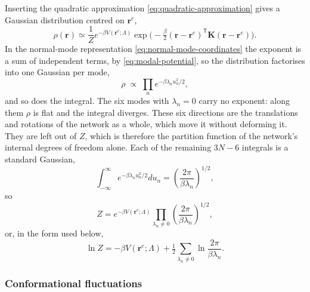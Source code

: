 \documentclass[11pt]{article}
\newcommand{\rr}{\mathbf{r}}
\newcommand{\KK}{\mathbf{K}}
\newcommand{\LL}{\Lambda}
\newcommand{\re}{\rr^{e}}
\begin{document}
Inserting the quadratic approximation \eqref{eq:quadratic-approximation} gives a Gaussian distribution centred on $\re$,
\begin{equation}
\boxed{
\rho(\rr) \simeq \frac{1}{Z} e^{-\beta V(\re;\LL)}
\exp\big(-\tfrac{\beta}{2}(\rr-\re)^{\mathsf T}\KK(\rr-\re)\big).
}
\label{eq:gaussian-distribution}
\end{equation}
In the normal-mode representation \eqref{eq:normal-mode-coordinates} the exponent is a sum of independent terms, by \eqref{eq:modal-potential}, so the distribution factorises into one Gaussian per mode,
\begin{equation}
\rho \;\propto\; \prod_n e^{-\beta\lambda_n u_n^{2}/2},
\label{eq:modal-distribution}
\end{equation}
and so does the integral.
The six modes with $\lambda_n = 0$ carry no exponent: along them $\rho$ is flat and the integral diverges.
These six directions are the translations and rotations of the network as a whole, which move it without deforming it.
They are left out of $Z$, which is therefore the partition function of the network's internal degrees of freedom alone.
Each of the remaining $3N-6$ integrals is a standard Gaussian,
\begin{equation}
\int_{-\infty}^{\infty} e^{-\beta\lambda_n u_n^2/2} du_n
= \left(\frac{2\pi}{\beta\lambda_n}\right)^{1/2},
\end{equation}
so
\begin{equation}
\boxed{
Z = e^{-\beta V(\re;\LL)} \prod_{\lambda_n \ne 0} \left(\frac{2\pi}{\beta\lambda_n}\right)^{1/2} ,
}
\label{eq:partition-function}
\end{equation}
or, in the form used below,
\begin{equation}
\boxed{
\ln Z = -\beta V(\re;\LL) + \tfrac12 \sum_{\lambda_n \ne 0} \ln\frac{2\pi}{\beta\lambda_n} .
}
\label{eq:log-partition-function}
\end{equation}

\subsubsection{Conformational fluctuations}
\label{sec:fluctuations}
\end{document}
